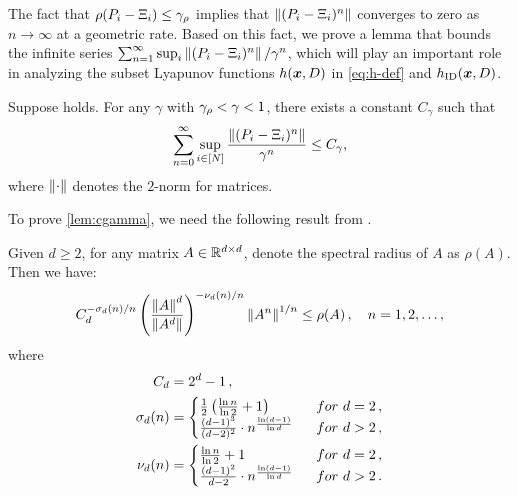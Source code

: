 The fact that $\rho(P_i - \Xi_i) \leq \gamma_{\rho}$ implies that $\left\lVert(P_i-\Xi_i)^n\right\rVert$ converges to zero as $n\to\infty$ at a geometric rate. 
Based on this fact, we prove a lemma that bounds the infinite series $\sum_{n=1}^{\infty} \sup_i\left\lVert(P_i-\Xi_i)^n\right\rVert / \gamma^n$, which will play an important role in analyzing the subset Lyapunov functions $h(\bm{x},D)$ in \eqref{eq:h-def} and $h_{\textnormal{ID}}(\bm{x},D)$. 

\begin{lemma}\label{lem:cgamma}
    Suppose  holds. For any $\gamma$ with $\gamma_{\rho}<\gamma<1$, there exists a constant $C_{\gamma}$ such that
\begin{align*}
    \sum_{n=0}^{\infty} \sup_{i\in[N]}\frac{\left\lVert(P_i-\Xi_i)^n\right\rVert}{\gamma^n}\leq C_{\gamma},
\end{align*}
where $\left\lVert\cdot\right\rVert$ denotes the $2$-norm for matrices. 
\end{lemma}


To prove \eqref{lem:cgamma}, we need the following result from \citet{Kozyakin_2009}. 

\begin{lemma}\label{lem:gelfand}
Given $d\geq 2$, for any matrix $A\in\mathbb{R}^{d\times d}$, denote the spectral radius of $A$ as $\rho(A)$. Then we have:
\begin{align*}
    C_d^{-\sigma_d(n)/n}\left(\frac{\left\lVert A\right\rVert^d}{\left\lVert A^d\right\rVert}\right)^{-\nu_d(n)/n}\left\lVert A^n\right\rVert^{1/n}\leq \rho(A)\,,\quad n=1,2,\dots,
\end{align*}
where 
\begin{align}\label{eq:gelfand coef}
    C_d&=2^d-1\,,\nonumber\\
    \sigma_d(n)&=\begin{cases}
        \frac{1}{2}\left(\frac{\ln n}{\ln 2}+1\right)~~ & for ~d=2\,,\\
        \frac{(d-1)^3}{(d-2)^2}\cdot n^{\frac{\ln (d-1)}{\ln d}}~~& for~ d>2\,,
    \end{cases}\\
    \nu_d(n)&=\begin{cases}
        \frac{\ln n}{\ln 2}+1~~&for ~ d=2\,,\\
        \frac{(d-1)^2}{d-2}\cdot n^{\frac{\ln (d-1)}{\ln d}}~~&for ~d>2\,.
    \end{cases}\nonumber
\end{align}
\end{lemma}


